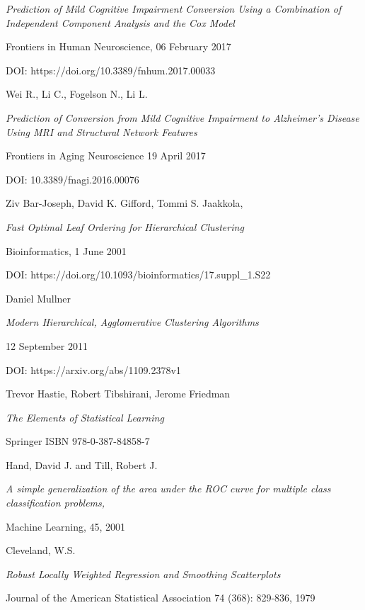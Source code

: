 \documentclass[12pt,openright,twoside,a4paper]{book}
\begin{document}
\begin{thebibliography}{99}
\emph{Prediction of Mild Cognitive Impairment Conversion Using a Combination of Independent Component Analysis and the Cox Model}

Frontiers in Human Neuroscience, 06 February 2017

DOI:  https://doi.org/10.3389/fnhum.2017.00033

Wei R., Li C., Fogelson N., Li L.

\emph{Prediction of Conversion from Mild Cognitive Impairment to Alzheimer's Disease Using MRI and Structural Network Features}

Frontiers in Aging Neuroscience  19 April 2017

DOI: 10.3389/fnagi.2016.00076

Ziv Bar-Joseph, David K. Gifford, Tommi S. Jaakkola, 

\emph{Fast Optimal Leaf Ordering for Hierarchical Clustering}

 Bioinformatics, 1 June 2001
 
 DOI: https://doi.org/10.1093/bioinformatics/17.suppl\_1.S22
 
 Daniel Mullner
 
\emph{Modern Hierarchical, Agglomerative Clustering Algorithms} 

12 September 2011

DOI: https://arxiv.org/abs/1109.2378v1

Trevor Hastie, Robert Tibshirani, Jerome Friedman

\emph{The Elements of Statistical Learning}

Springer ISBN 978-0-387-84858-7

Hand, David J. and Till, Robert J.

\emph{A simple generalization of the area under the ROC curve for multiple class classification problems,}

Machine Learning, 45, 2001

Cleveland, W.S. 

\emph{Robust Locally Weighted Regression and Smoothing Scatterplots}

Journal of the American Statistical Association 74 (368): 829-836, 1979



 \end{thebibliography}
 
 
\end{document}
